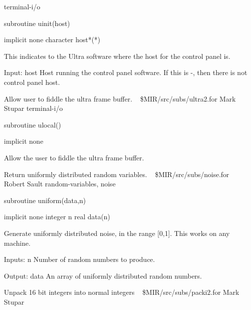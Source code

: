 \newline {} terminal-i/o
\par{\tenpoint
{\eightpoint\begintt
        subroutine uinit(host)

        implicit none
        character host*(*)

  This indicates to the Ultra software where the host for the control
  panel is.

  Input:
    host       Host running the control panel software. If this is -, then
               there is not control panel host.
\endtt}
\par}
%
\noindent Allow user to fiddle the ultra frame buffer.
\newline \ 
\newline {} \$MIR/src/subs/ultra2.for
\newline {} Mark Stupar
\newline {} terminal-i/o
\par{\tenpoint
{\eightpoint\begintt
        subroutine ulocal()

        implicit none

  Allow the user to fiddle the ultra frame buffer.
\endtt}
\par}
%
\noindent Return uniformly distributed random variables.
\newline \ 
\newline {} \$MIR/src/subs/noise.for
\newline {} Robert Sault
\newline \abox{Keywords:} random-variables, noise
\par{\tenpoint
{\eightpoint\begintt
        subroutine uniform(data,n)

        implicit none
        integer n
        real data(n)

  Generate uniformly distributed noise, in the range [0,1]. This works
  on any machine.

  Inputs:
    n          Number of random numbers to produce.

  Output:
    data       An array of uniformly distributed random numbers.
\endtt}
\par}
%
\noindent Unpack 16 bit integers into normal integers
\newline \ 
\newline {} \$MIR/src/subs/packi2.for
\newline \abox{Responsible:} Mark Stupar
